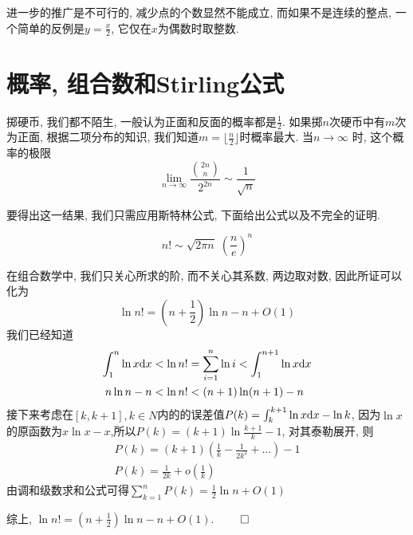 \documentclass[11pt]{article}%
\newtheorem{theorem}{{\hskip 1.7em \bf 定理}}
\renewenvironment{proof}{{\noindent\hskip 2em \bf 证明 \quad}}{\hfill$\qed$\par\vspace{1em}}
\begin{document}
    进一步的推广是不可行的, 减少点的个数显然不能成立, 而如果不是连续的整点, 一个简单的反例是$y=\frac{x}{2}$, 它仅在$x$为偶数时取整数.

    \section{概率, 组合数和Stirling公式}
    掷硬币, 我们都不陌生, 一般认为正面和反面的概率都是$\frac{1}{2}$. 如果掷$n$次硬币中有$m$次为正面, 根据二项分布的知识, 我们知道$m=\lfloor\frac{n}{2}\rfloor$时概率最大. 当$n\rightarrow \infty$ 时, 这个概率的极限
    \[
        \lim_{n\rightarrow \infty}\frac{\binom{2n}{n}}{2^{2n}}\sim\frac{1}{\sqrt{n}}
    \]


    要得出这一结果, 我们只需应用斯特林公式, 下面给出公式以及不完全的证明.
    \begin{theorem}[Stirling公式]
        \[
            n!\sim\sqrt{2\pi n}\;(\frac{n}{e})^n
        \]
    \end{theorem}
    \begin{proof}
        在组合数学中, 我们只关心所求的阶, 而不关心其系数, 两边取对数, 因此所证可以化为
        \[
            \ln{n!} = (n+\frac{1}{2})\ln n-n + O(1)
        \]
        我们已经知道
        \begin{align*}
            \int_1^n \ln x{\rm d}x<\ln{n!}&=\sum_{i=1}^n \ln i<\int_1^{n+1} \ln x{\rm d}x\\
            n\ln n-n<\ln{n!}&< (n+1)\ln (n+1)-n
        \end{align*}
        接下来考虑在$[k, k+1],k\in{N}$内的的误差值$ P(k) = \int_k^{k+1} \ln x{\rm d}x - \ln k$, 因为$\ln x$的原函数为$x \ln x - x$,所以$P(k) = (k+1) \ln \frac{k+1}{k} - 1$, 对其泰勒展开, 则
        \begin{gather*}
            P(k) =(k+1)\left(\frac{1}{k}-\frac{1}{2k^2}+\dots\right) -1 \\
            P(k) = \frac{1}{2k}+o\left(\frac{1}{k}\right)
        \end{gather*}
        由调和级数求和公式可得$\sum_{k=1}^n P(k) = \frac{1}{2} \ln n + O(1)$

        综上, $\ln{n!} = (n+\frac{1}{2})\ln n-n + O(1)$.
    \end{proof}
\end{document}
